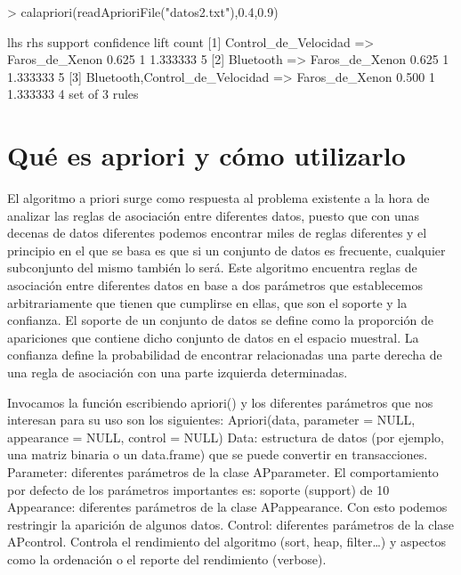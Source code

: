 \documentclass [a4paper] {article}
\begin{document}
\begin{Schunk}
\begin{Sinput}
> calapriori(readAprioriFile("datos2.txt"),0.4,0.9)
\end{Sinput}
\begin{Soutput}
    lhs                                 rhs              support confidence lift     count
[1] {Control_de_Velocidad}           => {Faros_de_Xenon} 0.625   1          1.333333 5    
[2] {Bluetooth}                      => {Faros_de_Xenon} 0.625   1          1.333333 5    
[3] {Bluetooth,Control_de_Velocidad} => {Faros_de_Xenon} 0.500   1          1.333333 4    
set of 3 rules 
\end{Soutput}
\end{Schunk}

\section{Qué es apriori y cómo utilizarlo}
El algoritmo a priori surge como respuesta al problema existente a la hora de analizar las reglas de asociación 
entre diferentes datos, puesto que con unas decenas de datos diferentes podemos encontrar miles de reglas diferentes y el
principio en el que se basa es que si un conjunto de datos es frecuente, cualquier subconjunto del mismo también lo será. 
Este algoritmo encuentra reglas de asociación entre diferentes datos en base a dos parámetros que establecemos 
arbitrariamente que tienen que cumplirse en ellas, que son el soporte y la confianza. El soporte de un conjunto de datos se 
define como la proporción de apariciones que contiene dicho conjunto de datos en el espacio muestral. La confianza define 
la probabilidad de encontrar relacionadas una parte derecha de una regla de asociación con una parte izquierda determinadas.

\vspace{5mm}

Invocamos la función escribiendo apriori() y los diferentes parámetros que nos interesan para su uso son los siguientes:
Apriori(data, parameter = NULL, appearance = NULL, control = NULL)
Data: estructura de datos (por ejemplo, una matriz binaria o un data.frame) que se puede convertir en transacciones.
Parameter: diferentes parámetros de la clase APparameter. El comportamiento por defecto de los parámetros importantes es: soporte (support) de 10%
Appearance: diferentes parámetros de la clase APappearance. Con esto podemos restringir la aparición de algunos datos.
Control: diferentes parámetros de la clase APcontrol. Controla el rendimiento del algoritmo (sort, heap, filter…) y aspectos como la ordenación o el reporte del rendimiento (verbose).
\end{document}
